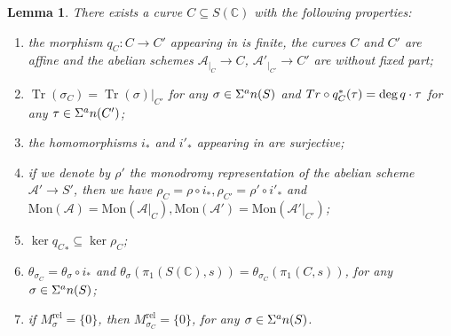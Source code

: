 \documentclass[10 pt,a4paper]{article}
\theoremstyle{plain}
\newtheorem{lem}[thm]{Lemma}
\theoremstyle{definition}
\theoremstyle{named}
\DeclareMathOperator{\Tr}{Tr}
\newcommand{\cA}{\mathcal A}
\newcommand{\bC}{\mathbb C}
\begin{document}
\begin{lem}\label{LefCurve}
    There exists a curve $C \subseteq S(\bC)$ with the following properties:
    \begin{enumerate}
        \item[$(i)$] the morphism $q_C:C \to C'$ appearing in  is finite, the curves $C$ and $C'$ are affine and the abelian schemes $\cA_{|_C} \to C$, $\cA'_{|_{C'}} \to C'$ are without fixed part; %

        \item[$(ii)$] $\Tr(\sigma_C)=\Tr(\sigma)|_{C'}$ for any $\sigma \in \Sigma^\textnormal{an}(S)$ and $\textnormal{Tr}\circ q_C^*(\tau) = \deg{q} \cdot \tau$ for any $\tau \in \Sigma^\textnormal{an}(C')$;

        \item[$(iii)$] the homomorphisms $i_*$ and $i'_*$ appearing in  are surjective;

        \item[$(iv)$] if we denote by $\rho'$ the monodromy representation of the abelian scheme $\cA'\to S'$, then we have $\rho_C=\rho\circ i_*, \rho_{C'}=\rho'\circ i'_*$ and $\textrm{Mon}(\cA)=\textrm{Mon}(\cA|_C), \textrm{Mon}(\cA')=\textrm{Mon}(\cA'|_{C'})$;

        \item[$(v)$] $\ker{{q_{C}}_\ast}\subseteq \ker{\rho_C}$;

        \item[$(vi)$] $\theta_{\sigma_C}=\theta_\sigma \circ i_*$ and $\theta_\sigma(\pi_1(S(\bC),s)) = \theta_{\sigma_C}(\pi_1(C,s))$, for any $\sigma \in \Sigma^\textnormal{an}(S)$;

        \item[$(vii)$] if $M_\sigma^\textrm{rel}=\{0\}$, then $M_{\sigma_C}^\textrm{rel}=\{0\}$, for any $\sigma \in \Sigma^\textnormal{an}(S)$.
    \end{enumerate}
\end{lem}
\end{document}
